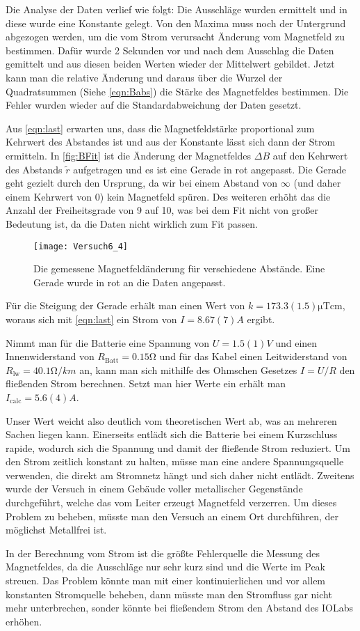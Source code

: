 Die Analyse der Daten verlief wie folgt: Die Ausschläge wurden ermittelt und in diese wurde eine Konstante gelegt.	Von den Maxima muss noch der Untergrund abgezogen werden, um die vom Strom verursacht Änderung vom Magnetfeld zu bestimmen. Dafür wurde 2 Sekunden vor und nach dem Ausschlag die Daten gemittelt und aus diesen beiden Werten wieder der Mittelwert gebildet. Jetzt kann man die relative Änderung und daraus über die Wurzel der Quadratsummen (Siehe \autoref{eqn:Babs}) die Stärke des Magnetfeldes bestimmen. Die Fehler wurden wieder auf die Standardabweichung der Daten gesetzt.

Aus \autoref{eqn:last} erwarten uns, dass die Magnetfeldstärke proportional zum Kehrwert des Abstandes ist und aus der Konstante lässt sich dann der Strom ermitteln. In \autoref{fig:BFit} ist die Änderung der Magnetfeldes \( \Delta B \) auf den Kehrwert des Abstands \( \tilde{r} \) aufgetragen und es ist eine Gerade in rot angepasst. Die Gerade geht gezielt durch den Ursprung, da wir bei einem Abstand von \( \infty \) (und daher einem Kehrwert von 0) kein Magnetfeld spüren. Des weiteren erhöht das die Anzahl der Freiheitsgrade von 9 auf 10, was bei dem Fit nicht von großer Bedeutung ist, da die Daten nicht wirklich zum Fit passen. 

\begin{figure}[H]	
	\centering
	\texttt{[image: Versuch6\_4]}
	\caption{Die gemessene Magnetfeldänderung für verschiedene Abstände. Eine Gerade wurde in rot an die Daten angepasst.}
	\label{fig:BFit}
\end{figure}

Für die Steigung der Gerade erhält man einen Wert von \( k = 173.3(1.5) \unit{\micro\tesla\cm} \), woraus sich mit \autoref{eqn:last} ein Strom von \( I = 8.67(7) \unit{A} \) ergibt.

Nimmt man für die Batterie eine Spannung von \( U = 1.5(1) \unit{V} \) und einen Innenwiderstand von \( R_{\text{Batt}} = 0.15 \unit{\ohm} \) und für das Kabel einen Leitwiderstand von \( R_{\text{lw}} = 40.1 \unit{\ohm/km} \) an, kann man sich mithilfe des Ohmschen Gesetzes \( I = U/R \) den fließenden Strom berechnen. Setzt man hier Werte ein erhält man \( I_{\text{calc}} = 5.6(4) \unit{A} \).

Unser Wert weicht also deutlich vom theoretischen Wert ab, was an mehreren Sachen liegen kann. Einerseits entlädt sich die Batterie bei einem Kurzschluss rapide, wodurch sich die Spannung und damit der fließende Strom reduziert. Um den Strom zeitlich konstant zu halten, müsse man eine andere Spannungsquelle verwenden, die direkt am Stromnetz hängt und sich daher nicht entlädt. Zweitens wurde der Versuch in einem Gebäude voller metallischer Gegenstände durchgeführt, welche das vom Leiter erzeugt Magnetfeld verzerren. Um dieses Problem zu beheben, müsste man den Versuch an einem Ort durchführen, der möglichst Metallfrei ist. 

In der Berechnung vom Strom ist die größte Fehlerquelle die Messung des Magnetfeldes, da die Ausschläge nur sehr kurz sind und die Werte im Peak streuen. Das Problem könnte man mit einer kontinuierlichen und vor allem konstanten Stromquelle beheben, dann müsste man den Stromfluss gar nicht mehr unterbrechen, sonder könnte bei fließendem Strom den Abstand des IOLabs erhöhen.